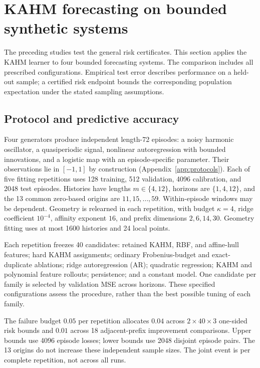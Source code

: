 \section{KAHM forecasting on bounded synthetic systems}
\label{sec:experiments}

The preceding studies test the general risk certificates. This section applies
the KAHM learner to four bounded forecasting systems. The comparison includes
all prescribed configurations. Empirical test error describes performance on
a held-out sample; a certified risk endpoint bounds the corresponding
population expectation under the stated sampling assumptions.

\subsection{Protocol and predictive accuracy}

Four generators produce independent length-72 episodes: a noisy harmonic
oscillator, a quasiperiodic signal, nonlinear autoregression with bounded
innovations, and a logistic map with an episode-specific parameter. Their
observations lie in $[-1,1]$ by construction
(Appendix~\ref{app:protocols}). Each of five fitting repetitions uses 128
training, 512 validation, 4096 calibration, and 2048 test episodes. Histories
have lengths $m\in\{4,12\}$, horizons are $\{1,4,12\}$, and the 13 common
zero-based origins are $11,15,\ldots,59$. Within-episode windows may be
dependent. Geometry is relearned in each repetition, with budget $\kappa=4$,
ridge coefficient $10^{-4}$, affinity exponent $16$, and prefix dimensions
$2,6,14,30$. Geometry fitting uses at most 1600 histories and 24 local points.

Each repetition freezes 40 candidates: retained KAHM, RBF, and affine-hull
features; hard KAHM assignments; ordinary Frobenius-budget and exact-duplicate
ablations; ridge autoregression (AR); quadratic regression; KAHM and polynomial
feature rollouts; persistence; and a constant model. One candidate per family
is selected by validation MSE across horizons. These specified configurations
assess the procedure, rather than the best possible tuning of each family.

The failure budget $0.05$ per repetition allocates $0.04$ across
$2\times40\times3$ one-sided risk bounds and $0.01$ across 18 adjacent-prefix
improvement comparisons. Upper bounds use 4096 episode losses; lower bounds
use 2048 disjoint episode pairs. The 13 origins do not increase these independent
sample sizes. The joint event is per complete repetition, not across all runs.

